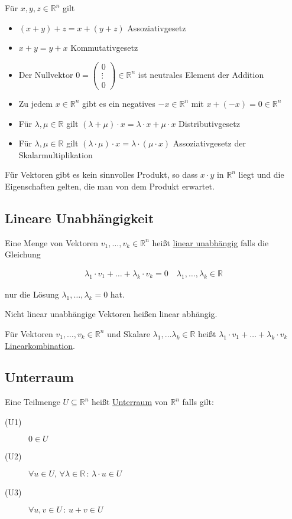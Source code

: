 Für $x,y,z \in \mathbb{R}^n$ gilt
\begin{itemize}
	\item{$(x+y)+z = x+(y+z)$ Assoziativgesetz}
	\item{$x+y = y+x$ Kommutativgesetz}
	\item{Der Nullvektor $0 = \begin{pmatrix}0 \\ \vdots \\ 0\end{pmatrix} \in \mathbb{R}^n$ ist neutrales Element der Addition}
	\item{Zu jedem $x \in \mathbb{R}^n$ gibt es ein \glqq{}negatives\grqq{} $-x \in \mathbb{R}^n$ mit $x + (-x) = 0 \in \mathbb{R}^n$}
	\item{Für $\lambda,\mu \in \mathbb{R}$ gilt $(\lambda + \mu)\cdot x = \lambda \cdot x + \mu \cdot x$ Distributivgesetz}
	\item{Für $\lambda,\mu \in \mathbb{R}$ gilt $(\lambda \cdot \mu) \cdot x = \lambda \cdot (\mu \cdot x)$ Assoziativgesetz der Skalarmultiplikation}
\end{itemize}

Für Vektoren gibt es kein \glqq{}sinnvolles\grqq{} Produkt, so dass $x\cdot y$ in $\mathbb{R}^n$ liegt und die Eigenschaften gelten, die man von dem Produkt erwartet.

\subsection{Lineare Unabhängigkeit}
Eine Menge von Vektoren $v_1,\dots,v_k \in \mathbb{R}^n$ heißt \underline{linear unabhängig} falls die Gleichung

\begin{align*}
	\lambda _1 \cdot v_1 +\dots+\lambda _k \cdot v_k = 0\quad \lambda _1,\dots,\lambda _k \in \mathbb{R}
\end{align*}

nur die Lösung $\lambda _1,\dots,\lambda _k = 0$ hat.

Nicht linear unabhängige Vektoren heißen linear abhängig.

Für Vektoren $v_1,\dots,v_k \in \mathbb{R}^n$ und Skalare $\lambda _1,\dots\lambda _k \in \mathbb{R}$ heißt $\lambda _1 \cdot v_1+\dots+\lambda _k \cdot v_k$ \underline{Linearkombination}.

\subsection{Unterraum}
Eine Teilmenge $U \subseteq \mathbb{R}^n$ heißt \underline{Unterraum} von $\mathbb{R}^n$ falls gilt:
\begin{description}
	\item[(U1)]{$0 \in U$}
	\item[(U2)]{$\forall u \in U,\, \forall \lambda \in \mathbb{R}\,:\,\lambda \cdot u \in U$}
	\item[(U3)]{$\forall u,v \in U\,:\,u+v \in U$}
\end{description}

